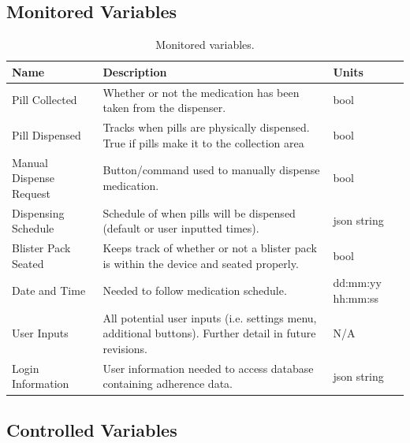 \documentclass[12pt,titlepage]{article}
\begin{document}
\subsection{Monitored Variables}
\begin{table}[ht!]
\begin{center}
\begin{adjustbox}{max width=\textwidth}
\small
\begin{tabular}{|p{}|p{}|p{}|}
 \hline
 \textbf{Name} & \textbf{Description} & \textbf{Units}\\
 \hline 
Pill Collected & Whether or not the medication has been taken from the dispenser. & bool\\
 \hline
Pill Dispensed & Tracks when pills are physically dispensed. True if pills make it to the collection area  & bool\\
 \hline
Manual Dispense Request & Button/command used to manually dispense medication. & bool \\
  \hline
Dispensing Schedule & Schedule of when pills will be dispensed (default or user inputted times). & json string \\
 \hline
  Blister Pack Seated & Keeps track of whether or not a blister pack is within the device and seated properly. & bool \\
 \hline
Date and Time & Needed to follow medication schedule. & dd:mm:yy hh:mm:ss\\
 \hline
User Inputs & All potential user inputs (i.e. settings menu, additional buttons). Further detail  in future revisions. & N/A\\
 \hline
 Login Information & User information needed to access database containing adherence data. & json string \\
 \hline

\end{tabular}
\end{adjustbox}
\end{center}
\caption{Monitored variables.}
\end{table}

\pagebreak

\subsection{Controlled Variables}
\end{document}
